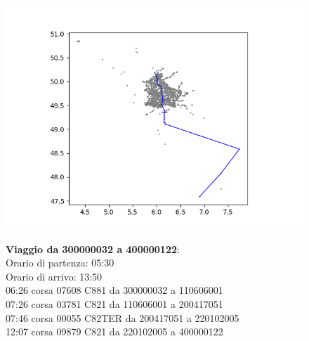 \documentclass{article}
\begin{document}
\begin{figure}[H]
	\begin{minipage}{0.55\linewidth}
		\centering
		\hspace*{-3cm}\includegraphics[width=1.0\linewidth, valign=t]{figures/Figure_1}
	\end{minipage}
	\hspace*{-2cm}\begin{minipage}{0.7\linewidth}
		\textbf{Viaggio da 300000032 a 400000122}:\\
		Orario di partenza: 05:30\\
		Orario di arrivo: 13:50\\
		06:26 corsa 07608 C881 da 300000032 a 110606001\\
		07:26 corsa 03781 C821 da 110606001 a 200417051\\
		07:46 corsa 00055 C82TER da 200417051 a 220102005\\
		12:07 corsa 09879 C821 da 220102005 a 400000122
		
			\end{minipage}
\end{figure}
\end{document}
